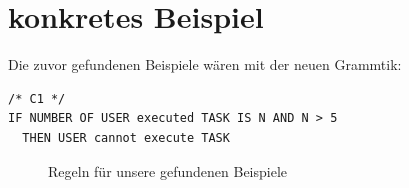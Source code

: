 %
%
\section{konkretes Beispiel}
Die zuvor gefundenen Beispiele wären mit der neuen Grammtik:\\
\begin{verbatim}
/* C1 */
IF NUMBER OF USER executed TASK IS N AND N > 5
  THEN USER cannot execute TASK
\end{verbatim}
\begin{figure}[!h]
\caption{Regeln für unsere gefundenen Beispiele}
\label{fig:resultrulefile}
\end{figure}
